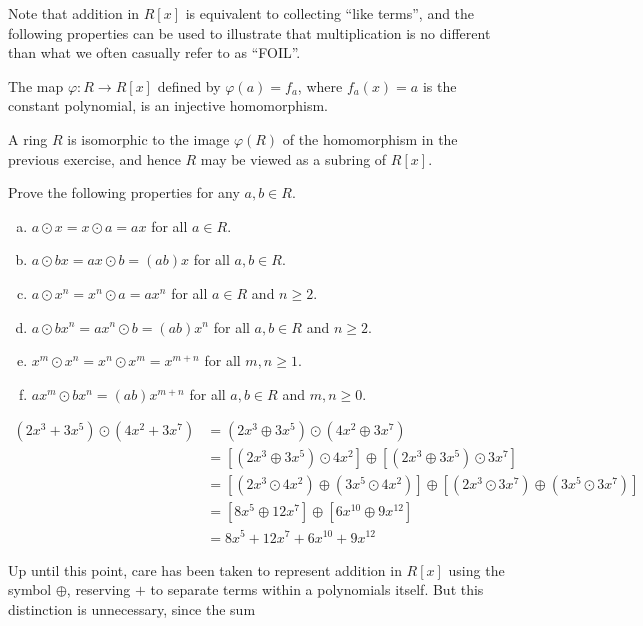 \documentclass[11pt,fleqn,dvipsnames,usenames]{article}
\newcommand{\p}{\noindent}
\begin{document}
\p Note that addition in $R[x]$ is equivalent to collecting ``like terms'', and the following properties can be used to illustrate that multiplication is no different than what we often casually refer to as ``FOIL''.
%
\begin{exercise}
The map $\varphi:R\to R[x]$ defined by $\varphi(a) = f_{a}$, where $f_{a}(x) = a$ is the constant polynomial, is an injective homomorphism.
\end{exercise}
%
\begin{remark} A ring $R$ is isomorphic to the image $\varphi(R)$ of the homomorphism in the previous exercise, and hence $R$ may be viewed as a subring of $R[x]$.
\end{remark}
%
\begin{exercise}
Prove the following properties for any $a,b\in R$.
\begin{enumerate}[(a)]
\item $a\odot x = x\odot a = ax$ for all $a\in R$.
\item $a\odot bx = ax\odot b = (ab)x$ for all $a,b\in R$.
\item $a\odot x^{n} = x^{n}\odot a = ax^{n}$ for all $a\in R$ and $n\geq 2$.
\item $a\odot bx^{n} = ax^{n}\odot b = (ab)x^{n}$ for all $a,b\in R$ and $n\geq 2$.
\item $x^{m}\odot x^{n} = x^{n}\odot x^{m} = x^{m+n}$ for all $m,n\geq 1$.
\item $ax^{m}\odot bx^{n} = (ab)x^{m+n}$ for all $a,b\in R$ and $m,n\geq 0$.
\end{enumerate}
\end{exercise}
%
\begin{example}
\begin{align*}
(2x^3 + 3x^5)\odot (4x^2 + 3x^7) &= (2x^3 \oplus 3x^5)\odot (4x^2 \oplus 3x^7)\\
&= \left[(2x^3 \oplus 3x^5)\odot 4x^2\right] \oplus \left[(2x^3 \oplus 3x^5) \odot 3x^7\right]\\
&= \left[(2x^3 \odot 4x^2) \oplus (3x^5 \odot 4x^2)\right] \oplus \left[(2x^3 \odot 3x^7) \oplus (3x^5\odot 3x^7)\right]\\
&= \left[8x^5 \oplus 12x^7\right] \oplus \left[6x^{10} \oplus 9x^{12}\right]\\
&= 8x^5 + 12x^7 + 6x^{10} + 9x^{12}
\end{align*}
\end{example}
%
\remark Up until this point, care has been taken to represent addition in $R[x]$ using the symbol $\oplus$, reserving $+$ to separate terms within a polynomials itself.  But this distinction is unnecessary, since the sum
\end{document}
